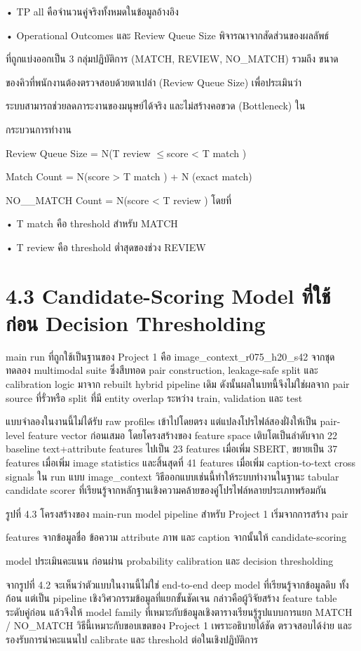 \documentclass[12pt,a4paper]{report}
\begin{document}
\noindent • TP all คือจำนวนคู่จริงทั้งหมดในข้อมูลอ้างอิง\par
\noindent • Operational Outcomes และ Review Queue Size พิจารณาจากสัดส่วนของผลลัพธ์\par
ที่ถูกแบ่งออกเป็น 3 กลุ่มปฏิบัติการ (MATCH, REVIEW, NO\_MATCH) รวมถึง ขนาด\par
ของคิวที่พนักงานต้องตรวจสอบด้วยตาเปล่า (Review Queue Size) เพื่อประเมินว่า\par
ระบบสามารถช่วยลดภาระงานของมนุษย์ได้จริง และไม่สร้างคอขวด (Bottleneck) ใน\par
กระบวนการทำงาน\par
Review Queue Size = N(T review \ensuremath{\leq}score < T match )\par
Match Count = N(score > T match ) + N (exact match)\par
NO\_\_MATCH Count = N(score < T review ) โดยที่\par
\noindent • T match คือ threshold สำหรับ MATCH\par
\noindent • T review คือ threshold ต่ำสุดของช่วง REVIEW\par
\section*{4.3 Candidate-Scoring Model ที่ใช้ก่อน Decision Thresholding}
main run ที่ถูกใช้เป็นฐานของ Project 1 คือ image\_context\_r075\_h20\_s42 จากชุดทดลอง multimodal suite ซึ่งสืบทอด pair construction, leakage-safe split และ calibration logic มาจาก rebuilt hybrid pipeline เดิม ดังนั้นผลในบทนี้จึงไม่ใช่ผลจาก pair source ที่รั่วหรือ split ที่มี entity overlap ระหว่าง train, validation และ test\par
\clearpage
แบบจำลองในงานนี้ไม่ได้รับ raw profiles เข้าไปโดยตรง แต่แปลงโปรไฟล์สองฝั่งให้เป็น pair-level feature vector ก่อนเสมอ โดยโครงสร้างของ feature space เติบโตเป็นลำดับจาก 22 baseline text+attribute features ไปเป็น 23 features เมื่อเพิ่ม SBERT, ขยายเป็น 37 features เมื่อเพิ่ม image statistics และสิ้นสุดที่ 41 features เมื่อเพิ่ม caption-to-text cross signals ใน run แบบ image\_context วิธีออกแบบเช่นนี้ทำให้ระบบทำงานในฐานะ tabular candidate scorer ที่เรียนรู้จากหลักฐานเชิงความคล้ายของคู่โปรไฟล์หลายประเภทพร้อมกัน\par
\begin{center}\small รูปที่ 4.3 โครงสร้างของ main-run model pipeline สำหรับ Project 1 เริ่มจากการสร้าง pair\end{center}
features จากข้อมูลชื่อ ข้อความ attribute ภาพ และ caption จากนั้นให้ candidate-scoring\par
model ประเมินคะแนน ก่อนผ่าน probability calibration และ decision thresholding\par
จากรูปที่ 4.2 จะเห็นว่าตัวแบบในงานนี้ไม่ใช่ end-to-end deep model ที่เรียนรู้จากข้อมูลดิบ ทั้งก้อน แต่เป็น pipeline เชิงวิศวกรรมข้อมูลที่แยกขั้นชัดเจน กล่าวคือผู้วิจัยสร้าง feature table ระดับคู่ก่อน แล้วจึงให้ model family ที่เหมาะกับข้อมูลเชิงตารางเรียนรู้รูปแบบการแยก MATCH / NO\_MATCH วิธีนี้เหมาะกับขอบเขตของ Project 1 เพราะอธิบายได้ชัด ตรวจสอบได้ง่าย และรองรับการนำคะแนนไป calibrate และ threshold ต่อในเชิงปฏิบัติการ\par
\end{document}
